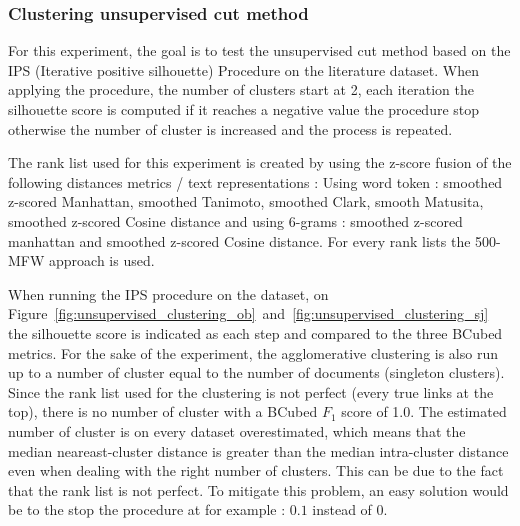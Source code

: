 \subsubsection{Clustering unsupervised cut method}

For this experiment, the goal is to test the unsupervised cut method based on the IPS (Iterative positive silhouette) Procedure on the literature dataset.
When applying the procedure, the number of clusters start at 2, each iteration the silhouette score is computed if it reaches a negative value the procedure stop otherwise the number of cluster is increased and the process is repeated.

The rank list used for this experiment is created by using the z-score fusion of the following distances metrics / text representations : Using word token : smoothed z-scored Manhattan, smoothed Tanimoto, smoothed Clark, smooth Matusita, smoothed z-scored Cosine distance and using 6-grams : smoothed z-scored manhattan and smoothed z-scored Cosine distance. For every rank lists the 500-MFW approach is used.

When running the IPS procedure on the dataset, on Figure~\ref{fig:unsupervised_clustering_ob}~and~\ref{fig:unsupervised_clustering_sj} the silhouette score is indicated as each step and compared to the three BCubed metrics.
For the sake of the experiment, the agglomerative clustering is also run up to a number of cluster equal to the number of documents (singleton clusters).
Since the rank list used for the clustering is not perfect (every true links at the top), there is no number of cluster with a BCubed $F_1$ score of 1.0.
The estimated number of cluster is on every dataset overestimated, which means that the median neareast-cluster distance is greater than the median intra-cluster distance even when dealing with the right number of clusters.
This can be due to the fact that the rank list is not perfect.
To mitigate this problem, an easy solution would be to the stop the procedure at for example : $0.1$ instead of $0$.

